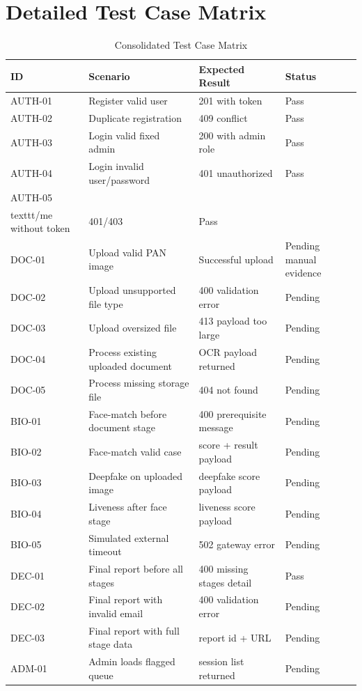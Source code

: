 \chapter{Detailed Test Case Matrix}
\label{app:test-matrix}

\small
\begin{longtable}{p{1.6cm}p{5.8cm}p{3.2cm}p{3.8cm}}
\caption{Consolidated Test Case Matrix}\\
\toprule
ID & Scenario & Expected Result & Status \\
\midrule
AUTH-01 & Register valid user & 201 with token & Pass \\
AUTH-02 & Duplicate registration & 409 conflict & Pass \\
AUTH-03 & Login valid fixed admin & 200 with admin role & Pass \\
AUTH-04 & Login invalid user/password & 401 unauthorized & Pass \\
AUTH-05 & \\texttt{/me} without token & 401/403 & Pass \\
DOC-01 & Upload valid PAN image & Successful upload & Pending manual evidence \\
DOC-02 & Upload unsupported file type & 400 validation error & Pending \\
DOC-03 & Upload oversized file & 413 payload too large & Pending \\
DOC-04 & Process existing uploaded document & OCR payload returned & Pending \\
DOC-05 & Process missing storage file & 404 not found & Pending \\
BIO-01 & Face-match before document stage & 400 prerequisite message & Pending \\
BIO-02 & Face-match valid case & score + result payload & Pending \\
BIO-03 & Deepfake on uploaded image & deepfake score payload & Pending \\
BIO-04 & Liveness after face stage & liveness score payload & Pending \\
BIO-05 & Simulated external timeout & 502 gateway error & Pending \\
DEC-01 & Final report before all stages & 400 missing stages detail & Pass \\
DEC-02 & Final report with invalid email & 400 validation error & Pending \\
DEC-03 & Final report with full stage data & report id + URL & Pending \\
ADM-01 & Admin loads flagged queue & session list returned & Pending \\

\end{longtable}
